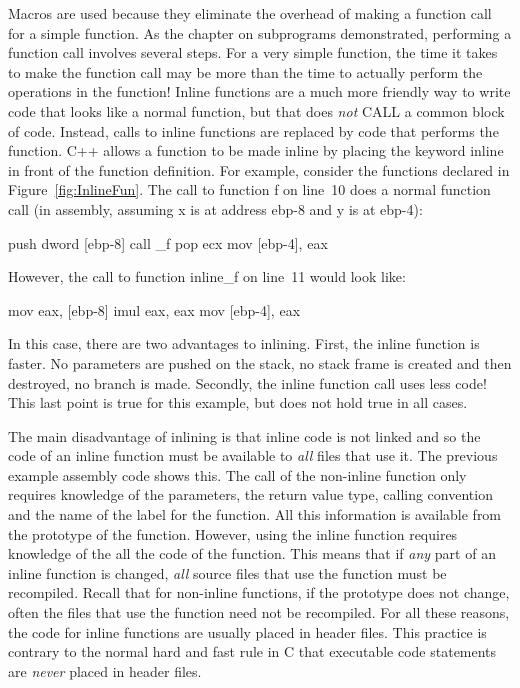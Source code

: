Macros are used because they eliminate the overhead of making a
function call for a simple function. As the chapter on subprograms
demonstrated, performing a function call involves several steps. For a
very simple function, the time it takes to make the function call may
be more than the time to actually perform the operations in the
function! Inline functions are a much more friendly way to write code
that looks like a normal function, but that does \emph{not} {\code
CALL} a common block of code. Instead, calls to inline functions are
replaced by code that performs the function.  C++ allows a function to
be made inline by placing the keyword {\code inline} in front of the
function definition. For example, consider the functions declared in
Figure~\ref{fig:InlineFun}. The call to function {\code f} on line~10
does a normal function call (in assembly, assuming {\code x} is at
address {\code ebp-8} and {\code y} is at {\code ebp-4}):
\begin{AsmCodeListing}
      push   dword [ebp-8]
      call   _f
      pop    ecx
      mov    [ebp-4], eax
\end{AsmCodeListing}
However, the call to function {\code inline\_f} on line~11 would look like:
\begin{AsmCodeListing}
      mov    eax, [ebp-8]
      imul   eax, eax
      mov    [ebp-4], eax
\end{AsmCodeListing}

In this case, there are two advantages to inlining. First, the inline function
is faster. No parameters are pushed on the stack, no stack frame is
created and then destroyed, no branch is made. Secondly, the inline function
call uses less code! This last point is true for this example, but does not
hold true in all cases.

The main disadvantage of inlining is that inline code is not linked
and so the code of an inline function must be available to \emph{all}
files that use it. The previous example assembly code shows this. The
call of the non-inline function only requires knowledge of the
parameters, the return value type, calling convention and the name of
the label for the function.  All this information is available from
the prototype of the function. However, using the inline function
requires knowledge of the all the code of the function. This means
that if \emph{any} part of an inline function is changed, \emph{all}
source files that use the function must be recompiled. Recall that for
non-inline functions, if the prototype does not change, often the
files that use the function need not be recompiled. For all these
reasons, the code for inline functions are usually placed in header
files. This practice is contrary to the normal hard and fast rule in C
that executable code statements are \emph{never} placed in header
files.

